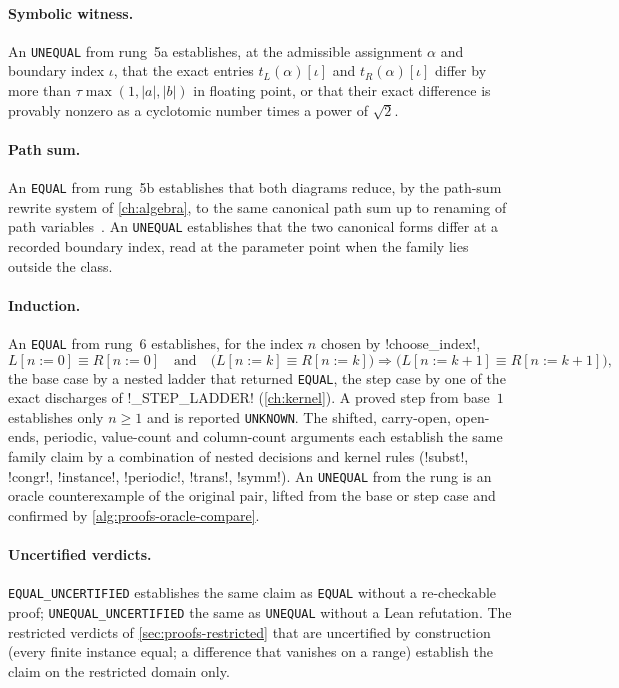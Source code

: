\paragraph{Symbolic witness.} An \texttt{UNEQUAL} from rung~5a establishes, at the admissible assignment $\alpha$ and boundary index $\iota$, that the exact entries $t_L(\alpha)[\iota]$ and $t_R(\alpha)[\iota]$ differ by more than $\tau\max(1,|a|,|b|)$ in floating point, or that their exact difference is provably nonzero as a cyclotomic number times a power of $\sqrt2$.

\paragraph{Path sum.} An \texttt{EQUAL} from rung~5b establishes that both diagrams reduce, by the path-sum rewrite system of \cref{ch:algebra}, to the same canonical path sum up to renaming of path variables~\cite{amy2018pathsums}. An \texttt{UNEQUAL} establishes that the two canonical forms differ at a recorded boundary index, read at the parameter point when the family lies outside the class.

\paragraph{Induction.} An \texttt{EQUAL} from rung~6 establishes, for the index $n$ chosen by \py!choose_index!,
\[
L[n:=0]\equiv R[n:=0]\quad\text{and}\quad\bigl(L[n:=k]\equiv R[n:=k]\bigr)\Rightarrow\bigl(L[n:=k+1]\equiv R[n:=k+1]\bigr),
\]
the base case by a nested ladder that returned \texttt{EQUAL}, the step case by one of the exact discharges of \py!_STEP_LADDER! (\cref{ch:kernel}). A proved step from base~$1$ establishes only $n\ge1$ and is reported \texttt{UNKNOWN}. The shifted, carry-open, open-ends, periodic, value-count and column-count arguments each establish the same family claim by a combination of nested decisions and kernel rules (\py!subst!, \py!congr!, \py!instance!, \py!periodic!, \py!trans!, \py!symm!). An \texttt{UNEQUAL} from the rung is an oracle counterexample of the original pair, lifted from the base or step case and confirmed by \cref{alg:proofs-oracle-compare}.

\paragraph{Uncertified verdicts.} \texttt{EQUAL\_UNCERTIFIED} establishes the same claim as \texttt{EQUAL} without a re-checkable proof; \texttt{UNEQUAL\_UNCERTIFIED} the same as \texttt{UNEQUAL} without a Lean refutation. The restricted verdicts of \cref{sec:proofs-restricted} that are uncertified by construction (every finite instance equal; a difference that vanishes on a range) establish the claim on the restricted domain only.

